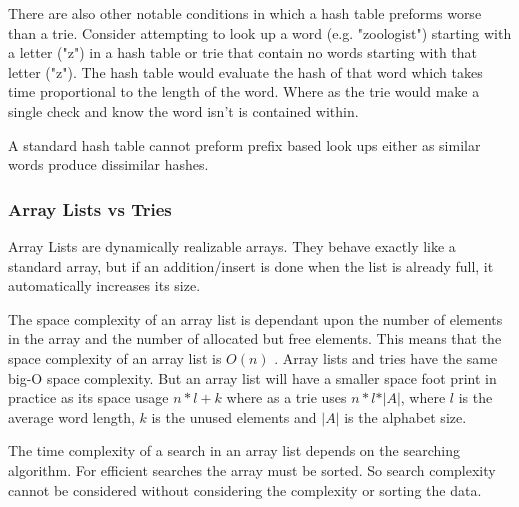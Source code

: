 \documentclass[10pt]{article} %
\begin{document}
			    There are also other notable conditions in which a hash table preforms worse than a trie. Consider attempting to look up a word (e.g. "zoologist") starting with a letter ("z") in a hash table or trie that contain no words starting with that letter ("z"). The hash table would evaluate the hash of that word which takes time proportional to the length of the word. Where as the trie would make a single check and know the word isn't is contained within.
			    
			    A standard hash table cannot preform prefix based look ups either as similar words produce dissimilar hashes.
			    
			    
			    
			\subsubsection{Array Lists vs Tries}
			    Array Lists are dynamically realizable arrays. They behave exactly like a standard array, but if an addition/insert is done when the list is already full, it automatically increases its size.
			    
			    The space complexity of an array list is dependant upon the number of elements in the array and the number of allocated but free elements. This means that the space complexity of an array list is 
			    \begin{math} O(n) \end{math} . Array lists and tries have the same big-O space complexity. But an array list will have a smaller space foot print in practice as its space usage \begin{math} n * l + k \end{math} where as a trie uses \begin{math} n * l * \vert A \vert \end{math}, where \begin{math} l \end{math} is the average word length, \begin{math} k \end{math} is the unused elements and \begin{math} \vert A \vert \end{math} is the alphabet size.
			    
			    The time complexity of a search in an array list depends on the searching algorithm. For efficient searches the array must be sorted. So search complexity cannot be considered without considering the complexity or sorting the data.
			    
\end{document}
